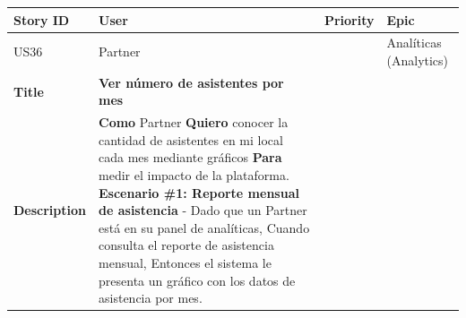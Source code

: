 {\def\LTcaptype{none} %
\begin{longtable}[]{@{}
  >{\raggedright\arraybackslash}p{}
  >{\raggedright\arraybackslash}p{}
  >{\raggedright\arraybackslash}p{}
  >{\raggedright\arraybackslash}p{}@{}}
\toprule\noalign{}
\begin{minipage}[b]{\linewidth}\raggedright
Story ID
\end{minipage} & \begin{minipage}[b]{\linewidth}\raggedright
User
\end{minipage} & \begin{minipage}[b]{\linewidth}\raggedright
Priority
\end{minipage} & \begin{minipage}[b]{\linewidth}\raggedright
Epic
\end{minipage} \\
\midrule\noalign{}
\endhead
\bottomrule\noalign{}
\endlastfoot
US36 & Partner & 5 & Analíticas (Analytics) \\
\textbf{Title} & \textbf{Ver número de asistentes por mes} & & \\
\textbf{Description} & \textbf{Como} Partner \textbf{Quiero} conocer la
cantidad de asistentes en mi local cada mes mediante gráficos
\textbf{Para} medir el impacto de la plataforma. \textbf{Escenario \#1:
Reporte mensual de asistencia} - Dado que un Partner está en su panel de
analíticas, Cuando consulta el reporte de asistencia mensual, Entonces
el sistema le presenta un gráfico con los datos de asistencia por mes. &
& \\
\end{longtable}
}

